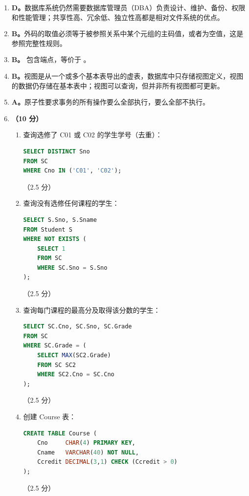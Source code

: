 \documentclass[a4paper,11pt]{article}
\begin{document}
\begin{enumerate}[start=21, label=\textbf{\arabic*.}, leftmargin=2.4em, itemsep=0.45em]

\item \textbf{D。}数据库系统仍然需要数据库管理员（DBA）负责设计、维护、备份、权限和性能管理；共享性高、冗余低、独立性高都是相对文件系统的优点。

\item \textbf{B。}外码的取值必须等于被参照关系中某个元组的主码值，或者为空值，这是参照完整性规则。

\item \textbf{B。} 包含端点，等价于 。

\item \textbf{B。}视图是从一个或多个基本表导出的虚表，数据库中只存储视图定义，视图的数据仍存储在基本表中；视图可以查询，但并非所有视图都可更新。

\item \textbf{A。}原子性要求事务的所有操作要么全部执行，要么全部不执行。

\item \textbf{（10 分）}
\begin{enumerate}[label=（\arabic*）, leftmargin=2.2em, itemsep=2pt]
  \item 查询选修了 C01 或 C02 的学生学号（去重）：
\begin{lstlisting}[language=SQL]
SELECT DISTINCT Sno
FROM SC
WHERE Cno IN ('C01', 'C02');
\end{lstlisting}
\hfill（2.5 分）

  \item 查询没有选修任何课程的学生：
\begin{lstlisting}[language=SQL]
SELECT S.Sno, S.Sname
FROM Student S
WHERE NOT EXISTS (
    SELECT 1
    FROM SC
    WHERE SC.Sno = S.Sno
);
\end{lstlisting}
\hfill（2.5 分）

  \item 查询每门课程的最高分及取得该分数的学生：
\begin{lstlisting}[language=SQL]
SELECT SC.Cno, SC.Sno, SC.Grade
FROM SC
WHERE SC.Grade = (
    SELECT MAX(SC2.Grade)
    FROM SC SC2
    WHERE SC2.Cno = SC.Cno
);
\end{lstlisting}
\hfill（2.5 分）

  \item 创建 Course 表：
\begin{lstlisting}[language=SQL]
CREATE TABLE Course (
    Cno     CHAR(4) PRIMARY KEY,
    Cname   VARCHAR(40) NOT NULL,
    Ccredit DECIMAL(3,1) CHECK (Ccredit > 0)
);
\end{lstlisting}
\hfill（2.5 分）
\end{enumerate}


\end{enumerate}
\end{document}
